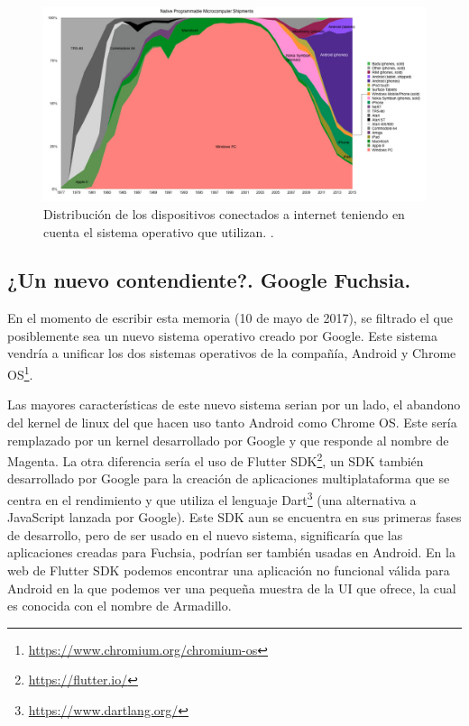 \begin{figure}[H]
\centering
  \includegraphics[width=\textwidth]{Figures/ch1/introduction/os_quota}
  \caption{Distribución de los dispositivos conectados a internet teniendo en cuenta el sistema operativo que utilizan.  \cite{PlatformsWar}. }
\end{figure}

\subsection{¿Un nuevo contendiente?. Google Fuchsia.}

\cite{Fuchsia} En el momento de escribir esta memoria (10 de mayo de 2017), se filtrado el que posiblemente sea un nuevo sistema operativo creado por Google. Este sistema vendría a unificar los dos sistemas operativos de la compañía, Android y Chrome OS\footnote{\url{https://www.chromium.org/chromium-os}}.

Las mayores características de este nuevo sistema serian por un lado, el abandono del kernel de linux del que hacen uso tanto Android como Chrome OS. Este sería remplazado por un kernel desarrollado por Google y que responde al nombre de Magenta. La otra diferencia sería el uso de Flutter SDK\footnote{\url{https://flutter.io/}}, un \gls{SDK} también desarrollado por Google para la creación de aplicaciones multiplataforma que se centra en el rendimiento y que utiliza el lenguaje Dart\footnote{\url{https://www.dartlang.org/}} (una alternativa a JavaScript lanzada por Google). Este \gls{SDK} aun se encuentra en sus primeras fases de desarrollo, pero de ser usado en el nuevo sistema, significaría que las aplicaciones creadas para Fuchsia, podrían ser también usadas en Android. En la web de Flutter SDK podemos encontrar una aplicación no funcional válida para Android en la que podemos ver una pequeña muestra de la UI que ofrece, la cual es conocida con el nombre de Armadillo.

